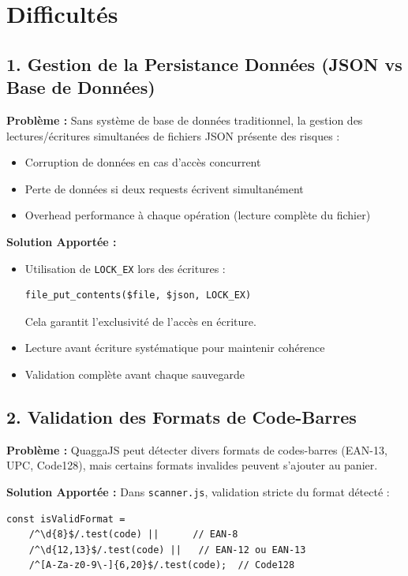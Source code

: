 \documentclass[12pt,a4paper]{report}
\begin{document}
\section{Difficultés}

\subsection{1. Gestion de la Persistance Données (JSON vs Base de Données)}

\textbf{Problème :}
Sans système de base de données traditionnel, la gestion des lectures/écritures simultanées de fichiers JSON présente des risques :
\begin{itemize}
    \item Corruption de données en cas d'accès concurrent
    \item Perte de données si deux requests écrivent simultanément
    \item Overhead performance à chaque opération (lecture complète du fichier)
\end{itemize}

\textbf{Solution Apportée :}
\begin{itemize}
    \item Utilisation de \texttt{LOCK\_EX} lors des écritures :
    \begin{lstlisting}
file_put_contents($file, $json, LOCK_EX)
    \end{lstlisting}
    Cela garantit l'exclusivité de l'accès en écriture.
    
    \item Lecture avant écriture systématique pour maintenir cohérence
    
    \item Validation complète avant chaque sauvegarde
\end{itemize}

\subsection{2. Validation des Formats de Code-Barres}

\textbf{Problème :}
QuaggaJS peut détecter divers formats de codes-barres (EAN-13, UPC, Code128), mais certains formats invalides peuvent s'ajouter au panier.

\textbf{Solution Apportée :}
Dans \texttt{scanner.js}, validation stricte du format détecté :
\begin{lstlisting}
const isValidFormat = 
    /^\d{8}$/.test(code) ||      // EAN-8
    /^\d{12,13}$/.test(code) ||   // EAN-12 ou EAN-13
    /^[A-Za-z0-9\-]{6,20}$/.test(code);  // Code128
\end{lstlisting}
\end{document}
